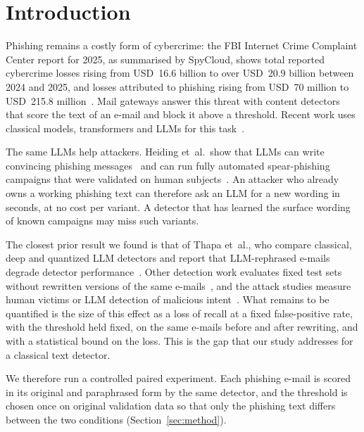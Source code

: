\section{Introduction}
\label{sec:intro}

Phishing remains a costly form of cybercrime: the FBI Internet Crime Complaint Center report for 2025, as summarised by SpyCloud, shows total reported cybercrime losses rising from USD~16.6 billion to over USD~20.9 billion between 2024 and 2025, and losses attributed to phishing rising from USD~70 million to USD~215.8 million~\cite{thies_fbi_2026}. Mail gateways answer this threat with content detectors that score the text of an e-mail and block it above a threshold. Recent work uses classical models, transformers and LLMs for this task~\cite{koide_chatspamdetector_2024,uddin_explainable_2024,thapa_phishing_2025,kuikel_evaluating_2025,ganiuly_trustworthiness_2025}.

The same LLMs help attackers. Heiding et~al.\ show that LLMs can write convincing phishing messages~\cite{heiding_devising_2023} and can run fully automated spear-phishing campaigns that were validated on human subjects~\cite{heiding_evaluating_2024}. An attacker who already owns a working phishing text can therefore ask an LLM for a new wording in seconds, at no cost per variant. A detector that has learned the surface wording of known campaigns may miss such variants.

The closest prior result we found is that of Thapa et~al., who compare classical, deep and quantized LLM detectors and report that LLM-rephrased e-mails degrade detector performance~\cite{thapa_phishing_2025}. Other detection work evaluates fixed test sets without rewritten versions of the same e-mails~\cite{koide_chatspamdetector_2024}, and the attack studies measure human victims or LLM detection of malicious intent~\cite{heiding_devising_2023,heiding_evaluating_2024}. What remains to be quantified is the size of this effect as a loss of recall at a fixed false-positive rate, with the threshold held fixed, on the same e-mails before and after rewriting, and with a statistical bound on the loss. This is the gap that our study addresses for a classical text detector.

We therefore run a controlled paired experiment. Each phishing e-mail is scored in its original and paraphrased form by the same detector, and the threshold is chosen once on original validation data so that only the phishing text differs between the two conditions (Section~\ref{sec:method}).

